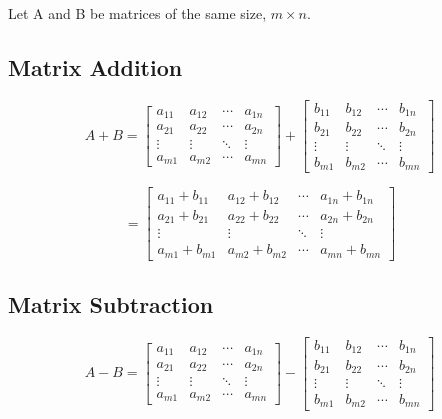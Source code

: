 \documentclass{article}
\begin{document}
Let A and B be matrices of the same size, $m \times n$. 

\subsection{Matrix Addition}

\[
A + B = 
\begin{bmatrix} 
a_{11} & a_{12} & \cdots & a_{1n} \\
a_{21} & a_{22} & \cdots & a_{2n} \\
\vdots & \vdots & \ddots & \vdots \\
a_{m1} & a_{m2} & \cdots & a_{mn}
\end{bmatrix} +
\begin{bmatrix} 
b_{11} & b_{12} & \cdots & b_{1n} \\
b_{21} & b_{22} & \cdots & b_{2n} \\
\vdots & \vdots & \ddots & \vdots \\
b_{m1} & b_{m2} & \cdots & b_{mn}
\end{bmatrix}
\]

\[
= \begin{bmatrix} 
a_{11}+b_{11} & a_{12}+b_{12} & \cdots & a_{1n}+b_{1n} \\
a_{21}+b_{21} & a_{22}+b_{22} & \cdots & a_{2n}+b_{2n} \\
\vdots & \vdots & \ddots & \vdots \\
a_{m1}+b_{m1} & a_{m2}+b_{m2} & \cdots & a_{mn}+b_{mn}
\end{bmatrix}
\]

\subsection{Matrix Subtraction}

\[
A - B = 
\begin{bmatrix} 
a_{11} & a_{12} & \cdots & a_{1n} \\
a_{21} & a_{22} & \cdots & a_{2n} \\
\vdots & \vdots & \ddots & \vdots \\
a_{m1} & a_{m2} & \cdots & a_{mn}
\end{bmatrix} -
\begin{bmatrix} 
b_{11} & b_{12} & \cdots & b_{1n} \\
b_{21} & b_{22} & \cdots & b_{2n} \\
\vdots & \vdots & \ddots & \vdots \\
b_{m1} & b_{m2} & \cdots & b_{mn}
\end{bmatrix}
\]
\end{document}
